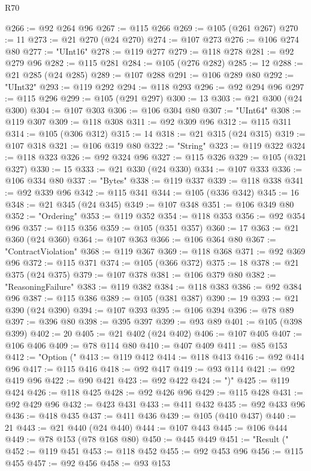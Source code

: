 \begin{lexlean}{R70}
\begin{coremodule}
@266 := @92 @264 @96
@267 := @115 @266
@269 := @105 (@261 @267)
@270 := 11
@273 := @21 @270 (@24 @270)
@274 := @107 @273
@276 := @106 @274 @80
@277 := "UInt16"
@278 := @119 @277
@279 := @118 @278
@281 := @92 @279 @96
@282 := @115 @281
@284 := @105 (@276 @282)
@285 := 12
@288 := @21 @285 (@24 @285)
@289 := @107 @288
@291 := @106 @289 @80
@292 := "UInt32"
@293 := @119 @292
@294 := @118 @293
@296 := @92 @294 @96
@297 := @115 @296
@299 := @105 (@291 @297)
@300 := 13
@303 := @21 @300 (@24 @300)
@304 := @107 @303
@306 := @106 @304 @80
@307 := "UInt64"
@308 := @119 @307
@309 := @118 @308
@311 := @92 @309 @96
@312 := @115 @311
@314 := @105 (@306 @312)
@315 := 14
@318 := @21 @315 (@24 @315)
@319 := @107 @318
@321 := @106 @319 @80
@322 := "String"
@323 := @119 @322
@324 := @118 @323
@326 := @92 @324 @96
@327 := @115 @326
@329 := @105 (@321 @327)
@330 := 15
@333 := @21 @330 (@24 @330)
@334 := @107 @333
@336 := @106 @334 @80
@337 := "Bytes"
@338 := @119 @337
@339 := @118 @338
@341 := @92 @339 @96
@342 := @115 @341
@344 := @105 (@336 @342)
@345 := 16
@348 := @21 @345 (@24 @345)
@349 := @107 @348
@351 := @106 @349 @80
@352 := "Ordering"
@353 := @119 @352
@354 := @118 @353
@356 := @92 @354 @96
@357 := @115 @356
@359 := @105 (@351 @357)
@360 := 17
@363 := @21 @360 (@24 @360)
@364 := @107 @363
@366 := @106 @364 @80
@367 := "ContractViolation"
@368 := @119 @367
@369 := @118 @368
@371 := @92 @369 @96
@372 := @115 @371
@374 := @105 (@366 @372)
@375 := 18
@378 := @21 @375 (@24 @375)
@379 := @107 @378
@381 := @106 @379 @80
@382 := "ReasoningFailure"
@383 := @119 @382
@384 := @118 @383
@386 := @92 @384 @96
@387 := @115 @386
@389 := @105 (@381 @387)
@390 := 19
@393 := @21 @390 (@24 @390)
@394 := @107 @393
@395 := @106 @394
@396 := @78 @89
@397 := @396 @80
@398 := @395 @397
@399 := @93 @89
@401 := @105 (@398 @399)
@402 := 20
@405 := @21 @402 (@24 @402)
@406 := @107 @405
@407 := @106 @406
@409 := @78 @114 @80
@410 := @407 @409
@411 := @85 @153
@412 := "Option ("
@413 := @119 @412
@414 := @118 @413
@416 := @92 @414 @96
@417 := @115 @416
@418 := @92 @417
@419 := @93 @114
@421 := @92 @419 @96
@422 := @90 @421
@423 := @92 @422
@424 := ")"
@425 := @119 @424
@426 := @118 @425
@428 := @92 @426 @96
@429 := @115 @428
@431 := @92 @429 @96
@432 := @423 @431
@433 := @411 @432
@435 := @92 @433 @96
@436 := @418 @435
@437 := @411 @436
@439 := @105 (@410 @437)
@440 := 21
@443 := @21 @440 (@24 @440)
@444 := @107 @443
@445 := @106 @444
@449 := @78 @153 (@78 @168 @80)
@450 := @445 @449
@451 := "Result ("
@452 := @119 @451
@453 := @118 @452
@455 := @92 @453 @96
@456 := @115 @455
@457 := @92 @456
@458 := @93 @153

\end{coremodule}
\end{lexlean}
